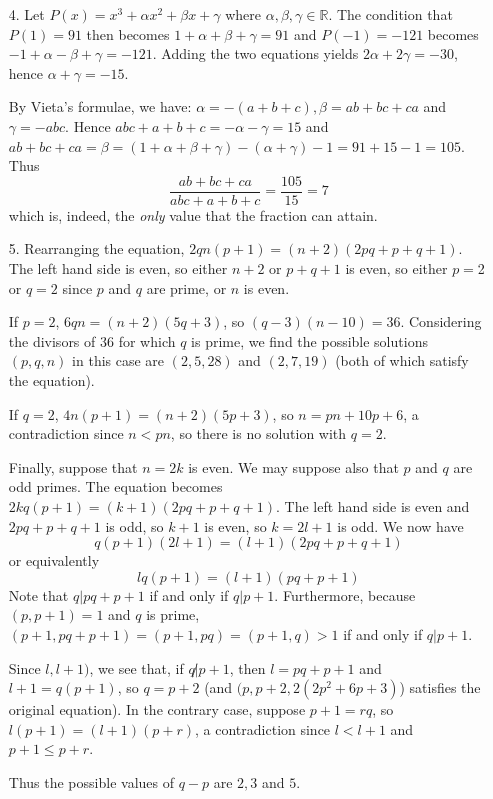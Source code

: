 \documentclass[a4paper, 12pt]{article}
\begin{document}
\begin{enumerate}
    \item[4.] Let $P(x) = x^3 + \alpha x^2 + \beta x + \gamma$ where $\alpha, \beta, \gamma \in \mathbb{R}$. The condition that $P(1) = 91$ then becomes $1 + \alpha + \beta + \gamma = 91$ and $P(-1) = -121$ becomes $-1 + \alpha - \beta + \gamma = -121$. Adding the two equations yields $2 \alpha + 2 \gamma = -30$, hence $\alpha + \gamma = -15$.
    
    By Vieta's formulae, we have: $\alpha = -(a+b+c), \beta = ab + bc + ca$ and $\gamma = -abc$. Hence $abc + a + b + c = - \alpha - \gamma = 15$ and $ab+bc+ca = \beta = (1 + \alpha + \beta + \gamma) - (\alpha + \gamma) - 1 = 91 + 15 - 1 = 105$. Thus
    \[  \frac{ab+bc+ca}{abc+a+b+c} = \frac{105}{15} = 7  \]
    which is, indeed, the \textit{only} value that the fraction can attain.
    
    \item[5.] Rearranging the equation, $2qn(p + 1) = (n + 2)(2pq + p + q + 1)$. The left hand side is even, so either $n + 2$ or $p + q + 1$ is even, so either $p = $2 or $q = 2$ since $p$ and $q$ are prime, or $n$ is even.
    
    If $p = 2$, $6qn = (n + 2)(5q + 3)$, so $(q - 3)(n - 10) = 36$. Considering the divisors of $36$ for which $q$ is prime, we find the possible solutions $(p, q, n)$ in this case are $(2, 5, 28)$ and $(2, 7, 19)$ (both of which satisfy the equation).
    
    If $q = 2$, $4n(p + 1) = (n + 2)(5p + 3)$, so $n = pn + 10p + 6$, a contradiction since $n < pn$, so there is no solution with $q = 2$.
    
    Finally, suppose that $n = 2k$ is even. We may suppose also that $p$ and $q$ are odd primes. The equation becomes $2kq(p + 1) = (k + 1)(2pq + p + q + 1)$. The left hand side is even and $2pq + p + q + 1$ is odd, so $k + 1$ is even, so $k = 2l + 1$ is odd. We now have
    $$ q(p + 1)(2l + 1) = (l + 1)(2pq + p + q + 1) $$
    or equivalently
    $$ lq(p + 1) = (l + 1)(pq + p + 1) $$
    Note that $q | pq + p + 1$ if and only if $q | p + 1$. Furthermore, because $(p, p + 1) = 1$ and $q$ is prime, $(p + 1, pq + p + 1) = (p + 1, pq) = (p + 1, q) > 1$ if and only if $q | p + 1$.
    
    Since $l, l+ 1)$, we see that, if $q \not | p + 1$, then $l = pq + p + 1$ and $l + 1 = q(p + 1)$, so $q = p + 2$ (and $(p, p + 2, 2(2p^2 + 6p + 3)$) satisfies the original equation). In the contrary case, suppose $p + 1 = rq$, so $l(p + 1) = (l + 1)(p + r)$, a contradiction since $l < l + 1$ and $p + 1 \leq p + r$.
    
    Thus the possible values of $q - p$ are $2, 3$ and $5$.



	
\end{enumerate}
\end{document}
